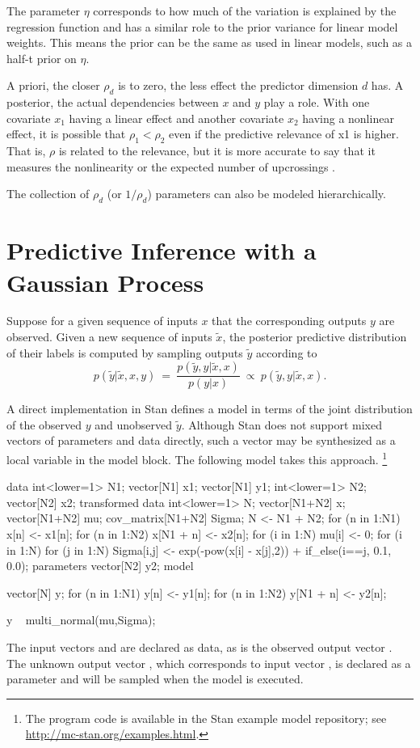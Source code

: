 The parameter $\eta$ corresponds to how much of the variation is
explained by the regression function and has a similar role to the
prior variance for linear model weights.  This means the prior can be
the same as used in linear models, such as a half-t prior on $\eta$.

A priori, the closer $\rho_d$ is to zero, the less effect the
predictor dimension $d$ has.  A posterior, the actual dependencies
between $x$ and $y$ play a role.  With one covariate $x_1$ having a
linear effect and another covariate $x_2$ having a nonlinear effect,
it is possible that $\rho_1 < \rho_2$ even if the predictive relevance
of x1 is higher. That is, $\rho$ is related to the relevance, but it
is more accurate to say that it measures the nonlinearity or the
expected number of upcrossings \cite[page~80]{RasmussenWilliams:2006}.

The collection of $\rho_d$ (or $1/\rho_d$) parameters can also be
modeled hierarchically.


\section{Predictive Inference with a Gaussian Process}

Suppose for a given sequence of inputs $x$ that the corresponding
outputs $y$ are observed.  Given a new sequence of inputs $\tilde{x}$,
the posterior predictive distribution of their labels is computed by
sampling outputs $\tilde{y}$ according to
\[
p(\tilde{y}|\tilde{x},x,y)
\ = \
\frac{p(\tilde{y}, y|\tilde{x},x)}
     {p(y|x)}
\ \propto \
p(\tilde{y}, y|\tilde{x},x).
\]

A direct implementation in Stan defines a model in terms of the
joint distribution of the observed $y$ and unobserved $\tilde{y}$.
Although Stan does not support mixed vectors of parameters and data
directly, such a vector may be synthesized as a local variable in the
model block.  The following model takes this approach.%
%
\footnote{The program code is available in the Stan example model repository;
see \url{http://mc-stan.org/examples.html}.}
%
\begin{stancode}
data {
  int<lower=1> N1;     
  vector[N1] x1; 
  vector[N1] y1;
  int<lower=1> N2;
  vector[N2] x2;
}
transformed data {
  int<lower=1> N;
  vector[N1+N2] x;
  vector[N1+N2] mu;
  cov_matrix[N1+N2] Sigma;
  N <- N1 + N2;
  for (n in 1:N1) x[n] <- x1[n];
  for (n in 1:N2) x[N1 + n] <- x2[n];
  for (i in 1:N) mu[i] <- 0;
  for (i in 1:N) 
    for (j in 1:N)
      Sigma[i,j] <- exp(-pow(x[i] - x[j],2)) 
                    + if_else(i==j, 0.1, 0.0);
}
parameters {
  vector[N2] y2;
}
model {
  vector[N] y;
  for (n in 1:N1) y[n] <- y1[n];
  for (n in 1:N2) y[N1 + n] <- y2[n];

  y ~ multi_normal(mu,Sigma);
}
\end{stancode}
%
The input vectors  and  are declared as data, as is
the observed output vector .  The unknown output vector
\code{y2}, which corresponds to input vector \code{x2}, is declared as
a parameter and will be sampled when the model is executed.  

